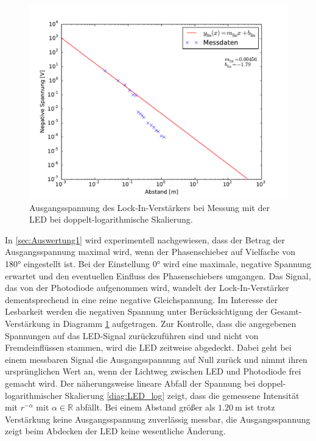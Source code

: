 \begin{figure}[hbp]
	\centering
		\includegraphics[width=\textwidth]{Bilder/LED_log.pdf}
	\caption{Ausgangsspannung des Lock-In-Verstärkers bei Messung mit der LED  bei doppelt-logarithmische Skalierung.}
	\label{diag:LED}
\end{figure}
In \ref{sec:Auswertung1} wird experimentell nachgewiesen, dass der Betrag der Ausgangsspannung maximal wird, wenn der Phasenschieber auf Vielfache von 180° eingestellt ist.
Bei der Einstellung 0° wird eine maximale, negative Spannung erwartet und den eventuellen Einfluss des Phasenschiebers umgangen.
Das Signal, das von der Photodiode aufgenommen wird, wandelt der Lock-In-Verstärker dementsprechend in eine reine negative Gleichspannung.
Im Interesse der Lesbarkeit werden die negativen Spannung unter Berücksichtigung der Gesamt-Verstärkung in Diagramm \ref{diag:LED} aufgetragen.
Zur Kontrolle, dass die angegebenen Spannungen auf das LED-Signal zurückzuführen sind und nicht von Fremdeinflüssen stammen, wird die LED zeitweise abgedeckt.
Dabei geht bei einem messbaren Signal die Ausgangsspannung auf Null zurück und nimmt ihren ursprünglichen Wert an, wenn der Lichtweg zwischen LED und Photodiode frei gemacht wird.
Der näherungsweise lineare Abfall der Spannung bei doppel-logarithmischer Skalierung \eqref{diag:LED_log} zeigt, dass die gemessene Intensität mit $r^{-\alpha}$ mit $\alpha \in \mathbb{R}$ abfällt.
Bei einem Abstand größer als $\SI{1.20}{\meter}$ ist trotz Verstärkung keine Ausgangsspannung zuverlässig messbar, 
die Ausgangsspannung zeigt beim Abdecken der LED keine wesentliche Änderung.

